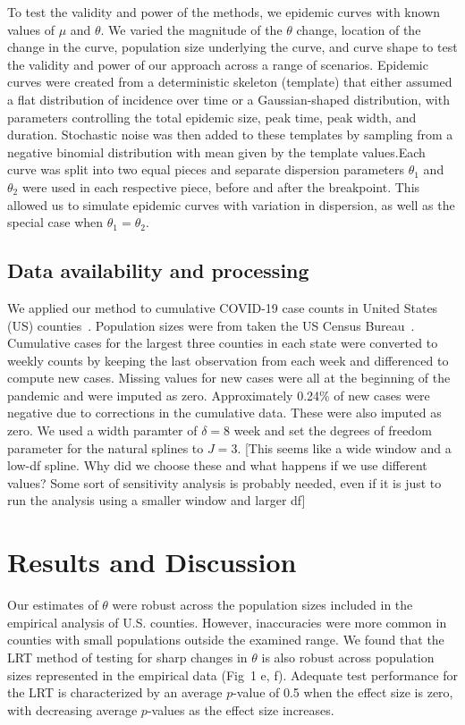 \documentclass[11pt,letterpaper]{article}
\begin{document}
To test the validity and power of the methods, we epidemic curves with known values of $\mu$ and $\theta$.
We varied the magnitude of the $\theta$ change, location of the change in the curve, population size underlying the curve, and curve shape to test the validity and power of our approach across a range of scenarios.
Epidemic curves were created from a deterministic skeleton (template) that either assumed a flat distribution of incidence over time or a Gaussian-shaped distribution, with parameters controlling the total epidemic size, peak time, peak width, and duration. 
Stochastic noise was then added to these templates by sampling from a negative binomial distribution with mean given by the template values.Each curve was split into two equal pieces and separate dispersion parameters $\theta_1$ and $\theta_2$ were used in each respective piece, before and after the breakpoint. 
This allowed us to simulate epidemic curves with variation in dispersion, as well as the special case when $\theta_1 = \theta_2$.

\subsection*{Data availability and processing}
We applied our method to cumulative COVID-19 case counts in United States (US) counties~\citep{nytimes_covid19}.
Population sizes were from taken the US Census Bureau~\citep{us_census_county_population_2021}.
Cumulative cases for the largest three counties in each state were converted to weekly counts by keeping the last observation from each week and differenced to compute new cases. Missing values for new cases were all at the beginning of the pandemic and were imputed as zero. 
Approximately 0.24\% of new cases were negative due to corrections in the cumulative data. These were also imputed as zero. 
We used a width paramter of $\delta = 8$ week and set the degrees of freedom parameter for the natural splines to $J = 3$.  
[This seems like a wide window and a low-df spline. Why did we choose these and what happens if we use different values? Some sort of sensitivity analysis is probably needed, even if it is just to run the analysis using a smaller window and larger df]

\section*{Results and Discussion}
Our estimates of $\theta$ were robust across the population sizes included in the empirical analysis of U.S. counties. 
However, inaccuracies were more common in counties with small populations outside the examined range.%
We found that the LRT method of testing for sharp changes in $\theta$ is also robust across population sizes represented in the empirical data (Fig\ 1 e, f). 
Adequate test performance for the LRT is characterized by an average \( p \)-value of 0.5 when the effect size is zero, with decreasing average $p$-values as the effect size increases. 
\end{document}
